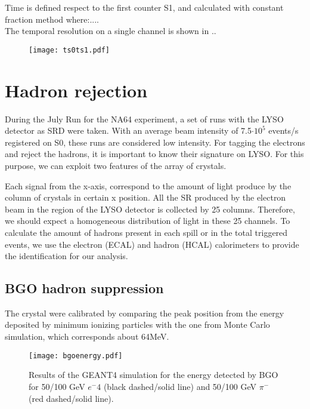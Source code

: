 Time is defined respect to the first counter S1, and calculated with constant fraction method where:....\\
The temporal resolution on a single channel is shown in ..\\
\begin{figure}[ht]
	\hspace*{\fill}
	\centering
	\texttt{[image: ts0ts1.pdf]}
	\hspace*{\fill}
	\caption{}\label{}
\end{figure}


\section{Hadron rejection}

During the July Run for the NA64 experiment, a set of runs with the LYSO detector as SRD were taken. With an average
beam intensity of 7.5$\cdot 10^5$ events/s registered on S0, these runs are considered low intensity. For tagging the
electrons and reject the hadrons, it is important to know their signature on LYSO. For this purpose, we can exploit two
features of the array of crystals.\par

Each signal from the x-axis, correspond to the amount of light produce by the column of crystals in certain x position.
All the SR produced by the electron beam in the region of the LYSO detector is collected by 25 columns. Therefore, we
should expect a homogeneous distribution of light in these 25 channels. To calculate the amount of hadrons present in
each spill or in the total triggered events, we use the electron (ECAL) and hadron (HCAL) calorimeters to provide the
identification for our analysis.\par


\subsection{BGO hadron suppression}

The crystal were calibrated by comparing the peak position from the energy deposited by minimum ionizing particles with
the one from Monte Carlo simulation, which corresponds about 64MeV. 

\begin{figure}[ht]
	\centering
	\hspace*{\fill}
	\texttt{[image: bgoenergy.pdf]}
	\hspace*{\fill}
	\captionsetup{margin=1cm}
	\caption{Results of the GEANT4 simulation for the energy detected by BGO for 50/100 GeV $e^-4$ (black dashed/solid
	line) and 50/100 GeV $\pi^-$ (red dashed/solid line).}\label{bgoe}
\end{figure}


